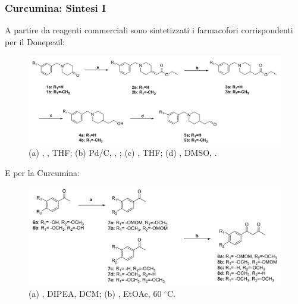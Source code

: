 \documentclass[9pt]{beamer}
\begin{document}
\begin{frame}
	\frametitle{Curcumina: Sintesi I}
	A partire da reagenti commerciali sono sintetizzati i farmacofori corrispondenti per il Donepezil:
	\begin{figure}
		\includegraphics[width=.7\textwidth]{immagini/farmadone_curcdone.png}
		{\caption*{\tiny{(a) ,  , THF;   (b) Pd/C,  , ;   (c)  , THF; (d) , DMSO, .}}}
	\end{figure}
	E per la Curcumina:
	\begin{figure}
		\includegraphics[width=.7\textwidth]{immagini/farmacurc_curcdone.png}
		{\caption*{\tiny{(a) , DIPEA, DCM; (b)  , EtOAc, 60 $^\circ$C.}}}
	\end{figure}
\end{frame}
\end{document}
